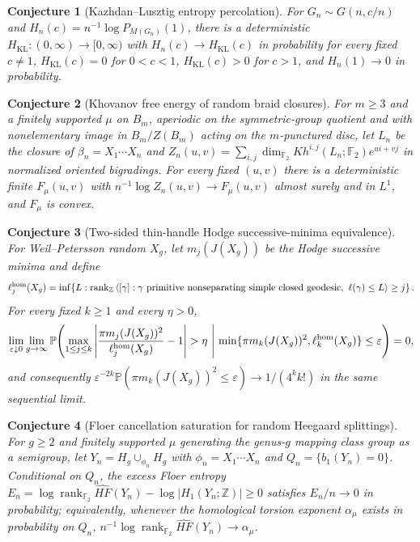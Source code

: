 \documentclass[11pt]{article}
\newtheorem{conjecture}{Conjecture}
\theoremstyle{definition}
\newcommand{\Pp}{\mathbb P}
\newcommand{\Z}{\mathbb Z}
\providecommand{\Z}{\mathbb Z}
\providecommand{\Pp}{\mathbb P}
\begin{document}
\begin{conjecture}[Kazhdan--Lusztig entropy percolation]\label{aq2}
For $G_n\sim G(n,c/n)$ and $H_n(c)=n^{-1}\log P_{M(G_n)}(1)$, there is a deterministic $H_{\mathrm{KL}}\colon(0,\infty)\to[0,\infty)$ with $H_n(c)\to H_{\mathrm{KL}}(c)$ in probability for every fixed $c\ne1$, $H_{\mathrm{KL}}(c)=0$ for $0<c<1$, $H_{\mathrm{KL}}(c)>0$ for $c>1$, and $H_n(1)\to0$ in probability.
\end{conjecture}

\begin{conjecture}[Khovanov free energy of random braid closures]\label{aq3}
For $m\ge3$ and a finitely supported $\mu$ on $B_m$, aperiodic on the symmetric-group quotient and with nonelementary image in $B_m/Z(B_m)$ acting on the $m$-punctured disc, let $L_n$ be the closure of $\beta_n=X_1\cdots X_n$ and $Z_n(u,v)=\sum_{i,j}\dim_{\mathbb F_2}Kh^{i,j}(L_n;\mathbb F_2)e^{ui+vj}$ in normalized oriented bigradings.  For every fixed $(u,v)$ there is a deterministic finite $F_\mu(u,v)$ with $n^{-1}\log Z_n(u,v)\to F_\mu(u,v)$ almost surely and in $L^1$, and $F_\mu$ is convex.
\end{conjecture}

\begin{conjecture}[Two-sided thin-handle Hodge successive-minima equivalence]\label{aq4}
For Weil--Petersson random $X_g$, let $m_j(J(X_g))$ be the Hodge successive minima and define
\[
\ell_j^{\rm hom}(X_g)=\inf\!\left\{L:\operatorname{rank}_{\Z}
\left\langle[\gamma]:\gamma\text{ primitive nonseparating simple closed
geodesic},\ \ell(\gamma)\le L\right\rangle\ge j\right\}.
\]
For every fixed $k\ge1$ and every $\eta>0$,
\[
\lim_{\varepsilon\downarrow0}\lim_{g\to\infty}\Pp\!\left(
\max_{1\le j\le k}\left|\frac{\pi m_j(J(X_g))^2}{\ell_j^{\rm hom}(X_g)}-1\right|>\eta\
\middle|\ \min\{\pi m_k(J(X_g))^2,\ell_k^{\rm hom}(X_g)\}\le\varepsilon\right)=0,
\]
and consequently
$\varepsilon^{-2k}\Pp(\pi m_k(J(X_g))^2\le\varepsilon)\to1/(4^kk!)$
in the same sequential limit.
\end{conjecture}

\begin{conjecture}[Floer cancellation saturation for random Heegaard splittings]\label{aq5}
For $g\ge2$ and finitely supported $\mu$ generating the genus-$g$ mapping class group as a semigroup, let $Y_n=H_g\cup_{\phi_n}H_g$ with $\phi_n=X_1\cdots X_n$ and $Q_n=\{b_1(Y_n)=0\}$.  Conditional on $Q_n$, the excess Floer entropy $E_n=\log\operatorname{rank}_{\mathbb F_2}\widehat{HF}(Y_n)-\log|H_1(Y_n;\Z)|\ge0$ satisfies $E_n/n\to0$ in probability; equivalently, whenever the homological torsion exponent $\alpha_\mu$ exists in probability on $Q_n$, $n^{-1}\log\operatorname{rank}_{\mathbb F_2}\widehat{HF}(Y_n)\to\alpha_\mu$.
\end{conjecture}
\end{document}
